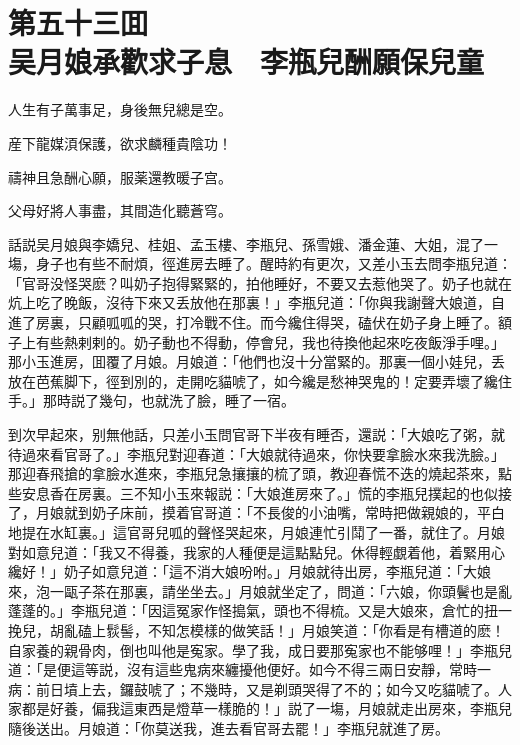 
\chapter*{第五十三囬　\\吴月娘承歡求子息　李瓶兒酬願保兒童}
\thispagestyle{empty}

\begin{myquote}
人生有子萬事足，身後無兒總是空。

産下龍媒湏保護，欲求麟種貴陰功！

禱神且急酬心願，服薬還教暖子宫。

父母好將人事盡，其間造化聽蒼穹。
\end{myquote}

話説吴月娘與李嬌兒、桂姐、孟玉樓、李瓶兒、孫雪娥、潘金蓮、大姐，混了一塲，身子也有些不耐煩，徑進房去睡了。醒時約有更次，又差小玉去問李瓶兒道：「官哥没怪哭麽？叫奶子抱得緊緊的，拍他睡好，不要又去惹他哭了。奶子也就在炕上吃了晚飯，沒待下來又丢放他在那裏！」李瓶兒道：「你與我謝聲大娘道，自進了房裏，只顧呱呱的哭，打冷戰不住。而今纔住得哭，磕伏在奶子身上睡了。額子上有些熱剌剌的。奶子動也不得動，停會兒，我也待換他起來吃夜飯淨手哩。」那小玉進房，囬覆了月娘。月娘道：「他們也沒十分當緊的。那裏一個小娃兒，丢放在芭蕉脚下，徑到別的，走開吃貓唬了，如今纔是愁神哭鬼的！定要弄壞了纔住手。」那時説了幾句，也就洗了臉，睡了一宿。

到次早起來，别無他話，只差小玉問官哥下半夜有睡否，還説：「大娘吃了粥，就待過來看官哥了。」李瓶兒對迎春道：「大娘就待過來，你快要拿臉水來我洗臉。」那迎春飛搶的拿臉水進來，李瓶兒急攘攘的梳了頭，教迎春慌不迭的燒起茶來，點些安息香在房裏。三不知小玉來報説：「大娘進房來了。」慌的李瓶兒撲起的也似接了，月娘就到奶子床前，摸着官哥道：「不長俊的小油嘴，常時把做親娘的，平白地提在水缸裏。」這官哥兒呱的聲怪哭起來，月娘連忙引鬦了一番，就住了。月娘對如意兒道：「我又不得養，我家的人種便是這點點兒。休得輕覷着他，着緊用心纔好！」奶子如意兒道：「這不消大娘吩咐。」月娘就待出房，李瓶兒道：「大娘來，泡一甌子茶在那裏，請坐坐去。」月娘就坐定了，問道：「六娘，你頭鬢也是亂蓬蓬的。」李瓶兒道：「因這冤家作怪搗氣，頭也不得梳。又是大娘來，倉忙的扭一挽兒，胡亂磕上䯼髻，不知怎模樣的做笑話！」月娘笑道：「你看是有槽道的麽！自家養的親骨肉，倒也叫他是寃家。學了我，成日要那寃家也不能够哩！」李瓶兒道：「是便這等説，沒有這些鬼病來纏擾他便好。如今不得三兩日安靜，常時一病：前日墳上去，鑼鼓唬了；不幾時，又是剃頭哭得了不的；如今又吃貓唬了。人家都是好養，偏我這東西是燈草一樣脆的！」説了一塲，月娘就走出房來，李瓶兒隨後送出。月娘道：「你莫送我，進去看官哥去罷！」李瓶兒就進了房。

